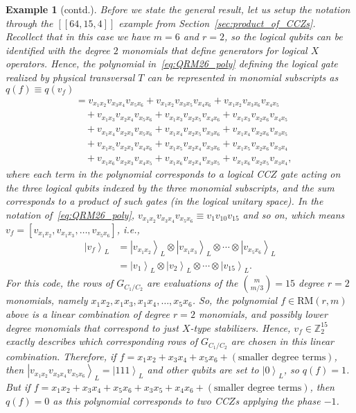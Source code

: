 \documentclass[twoside,romanappendices]{IEEEtran}
\newtheorem{example}{Example}
\newcommand{\ket}[1]{\left\lvert #1 \right\rangle}
\newcommand{\llbr}{[\![}
\newcommand{\rrbr}{]\!]}
\begin{document}
\addtocounter{example}{-3}

\begin{example}[contd.]
\normalfont
Before we state the general result, let us setup the notation through the $\llbr 64,15,4 \rrbr$ example from Section~\ref{sec:product_of_CCZs}.
Recollect that in this case we have $m = 6$ and $r = 2$, so the logical qubits can be identified with the degree $2$ monomials that define generators for logical $X$ operators.
Hence, the polynomial in~\eqref{eq:QRM26_poly} defining the logical gate realized by physical transversal $T$ can be represented in monomial subscripts as $q(f) \equiv q(v_f)$
\begin{align} 
%
   & = v_{x_1 x_2} v_{x_3 x_4} v_{x_5 x_6} + v_{x_1 x_2} v_{x_3 x_5} v_{x_4 x_6} + v_{x_1 x_2} v_{x_3 x_6} v_{x_4 x_5} \nonumber \\
     & \quad + v_{x_1 x_3} v_{x_2 x_4} v_{x_5 x_6} + v_{x_1 x_3} v_{x_2 x_5} v_{x_4 x_6} + v_{x_1 x_3} v_{x_2 x_6} v_{x_4 x_5}  \nonumber \\
     & \quad + v_{x_1 x_4} v_{x_2 x_3} v_{x_5 x_6} + v_{x_1 x_4} v_{x_2 x_5} v_{x_3 x_6} + v_{x_1 x_4} v_{x_2 x_6} v_{x_3 x_5}  \nonumber \\
     & \quad + v_{x_1 x_5} v_{x_2 x_3} v_{x_4 x_6} + v_{x_1 x_5} v_{x_2 x_4} v_{x_3 x_6} + v_{x_1 x_5} v_{x_2 x_6} v_{x_3 x_4}  \nonumber \\
     & \quad + v_{x_1 x_6} v_{x_2 x_3} v_{x_4 x_5} + v_{x_1 x_6} v_{x_2 x_4} v_{x_3 x_5} + v_{x_1 x_6} v_{x_2 x_5} v_{x_3 x_4},
\end{align}
where each term in the polynomial corresponds to a logical CC$Z$ gate acting on the three logical qubits indexed by the three monomial subscripts, and the sum corresponds to a product of such gates (in the logical unitary space).
In the notation of~\eqref{eq:QRM26_poly}, $v_{x_1 x_2} v_{x_3 x_4} v_{x_5 x_6} \equiv v_1 v_{10} v_{15}$ and so on, which means $v_f = [v_{x_1 x_2}, v_{x_1 x_3}, \ldots, v_{x_5 x_6}]$, i.e., 
\begin{align}
\ket{v_f}_L & = \ket{v_{x_1 x_2}}_L \otimes \ket{v_{x_1 x_3}}_L \otimes \cdots \otimes \ket{v_{x_5 x_6}}_L \nonumber \\
%
  & = \ket{v_1}_L \otimes \ket{v_2}_L \otimes \cdots \otimes \ket{v_{15}}_L.    
\end{align}
For this code, the rows of $G_{C_1/C_2}$ are evaluations of the $\binom{m}{m/3} = 15$ degree $r=2$ monomials, namely $x_1 x_2, x_1 x_3, x_1 x_4, \ldots, x_5 x_6$.
So, the polynomial $f \in \text{RM}(r,m)$ above is a linear combination of degree $r=2$ monomials, and possibly lower degree monomials that correspond to just $X$-type stabilizers. 
Hence, $v_f \in \mathbb{Z}_2^{15}$ exactly describes which corresponding rows of $G_{C_1/C_2}$ are chosen in this linear combination.
Therefore, if $f = x_1 x_2 + x_3 x_4 + x_5 x_6 + (\text{smaller\ degree\ terms})$, then $\ket{v_{x_1 x_2} v_{x_3 x_4} v_{x_5 x_6}}_L = \ket{111}_L$ and other qubits are set to $\ket{0}_L$, so $q(f) = 1$.
But if $f = x_1 x_2 + x_3 x_4 + x_5 x_6 + x_3 x_5 + x_4 x_6 + (\text{smaller\ degree\ terms})$, then $q(f) = 0$ as this polynomial corresponds to two CC$Z$s applying the phase $-1$.


\end{example}
\end{document}
